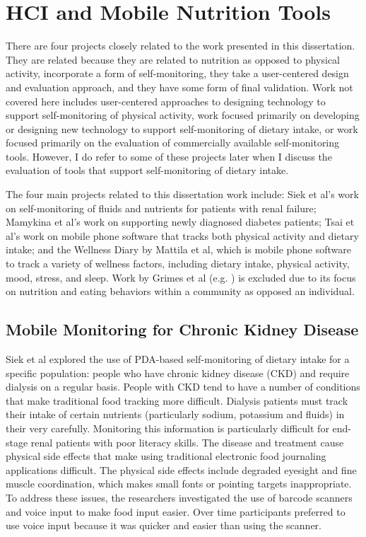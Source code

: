 \section{HCI and Mobile Nutrition Tools}
There are four projects closely related to the work presented in this dissertation. They are related because they are related to nutrition as opposed to physical activity, incorporate a form of self-monitoring, they take a user-centered design and evaluation approach, and they have some form of final validation. Work not covered here includes user-centered approaches to designing technology to support self-monitoring of physical activity, work focused primarily on developing or designing new technology to support self-monitoring of dietary intake, or work focused primarily on the evaluation of commercially available self-monitoring tools. However, I do refer to some of these projects later when I discuss the evaluation of tools that support self-monitoring of dietary intake. 

The four main projects related to this dissertation work include: Siek et al's \citep{siek_bridging_2009, siek_design_2006, siek_when_2006} work on self-monitoring of fluids and nutrients for patients with renal failure; Mamykina et al's work on supporting newly diagnosed diabetes patients; Tsai et al's work on mobile phone software that tracks both physical activity and dietary intake; and the Wellness Diary by Mattila et al, which is mobile phone software to track a variety of wellness factors, including dietary intake, physical activity, mood, stress, and sleep. Work by Grimes et al (e.g. ) is excluded due to its focus on nutrition and eating behaviors within a community as opposed an individual. 

\subsection{Mobile Monitoring for Chronic Kidney Disease}

Siek et al \citep{siek_bridging_2009, siek_design_2006, siek_when_2006} explored the use of PDA-based self-monitoring of dietary intake for a specific population: people who have chronic kidney disease (CKD) and require dialysis on a regular basis. People with CKD tend to have a number of conditions that make traditional food tracking more difficult. Dialysis patients must track their intake of certain nutrients (particularly sodium, potassium and fluids) in their  very carefully. Monitoring this information is particularly difficult for end-stage renal patients with poor literacy skills. The disease and treatment cause physical side effects that make using traditional electronic food journaling applications difficult. The physical side effects include degraded eyesight and fine muscle coordination, which makes small fonts or pointing targets inappropriate. To address these issues, the researchers investigated the use of barcode scanners and voice input to make food input easier. Over time participants preferred to use voice input because it was quicker and easier than using the scanner. 

